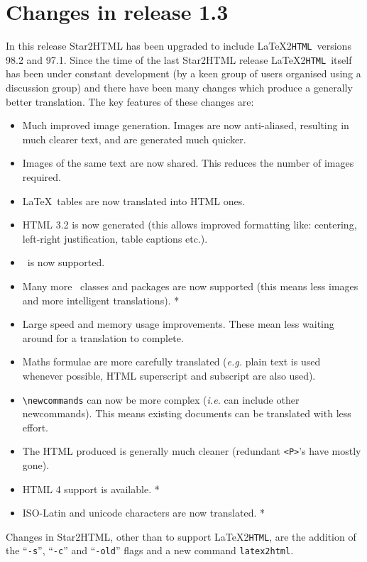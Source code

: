 \documentclass[twoside,11pt]{article}
\newcommand{\xlabel}[1]{}
\newcommand{\latextohtml}{\LaTeX2\texttt{HTML}}
\renewcommand{\_}{\texttt{\symbol{95}}}
\begin{document}
\section{\xlabel{changes13}\label{changes13}Changes in release 1.3}
In this release Star2HTML has been upgraded to include \latextohtml\
versions 98.2 and 97.1. Since the time of the last Star2HTML release
\latextohtml\ itself has been under constant development (by a keen
group of users organised using a discussion group) and there have been
many changes which produce a generally better translation. The key
features of these changes are:
\begin{itemize}
\item Much improved image generation. Images are now anti-aliased,
      resulting in much clearer text, and are generated much quicker.
\item Images of the same text are now shared. This reduces the number
      of images required.
\item \LaTeX\ tables are now translated into HTML ones.
\item HTML 3.2 is now generated (this allows improved formatting like:
      centering, left-right justification, table captions etc.).
\item \LaTeXe\ is now supported.
\item Many more \LaTeXe\ classes and packages are now supported (this
      means less images and more intelligent translations). *
\item Large speed and memory usage improvements. These mean
      less waiting around for a translation to complete.
\item Maths formulae are more carefully translated (\textit{e.g.}
      plain text is used whenever possible, HTML superscript and
      subscript are also used).
\item \verb#\newcommands# can now be more complex (\textit{i.e.} can
      include other newcommands). This means existing documents can be
      translated with less effort.
\item The HTML produced is generally much cleaner (redundant \verb#<P>#'s
      have mostly gone).
\item HTML 4 support is available. *
\item ISO-Latin and unicode characters are now translated. *
\end{itemize}

Changes in Star2HTML, other than to support \latextohtml, are the
addition of the ``\verb#-s#'', ``\verb#-c#'' and ``\verb#-old#'' flags 
and a new command \verb#latex2html#.
\end{document}
